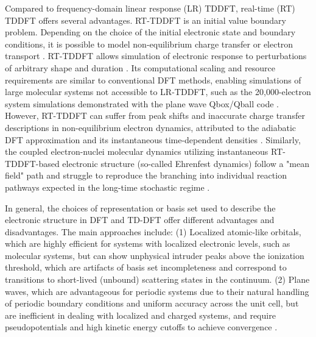 \documentclass[journal=jctcce,manuscript=article,etalmode=truncate,maxauthors=10,layout=twocolumn,9pt]{achemso}   %
\begin{document}
Compared to frequency-domain linear response (LR) TDDFT, real-time (RT) TDDFT offers several advantages. RT-TDDFT is an initial value boundary problem. Depending on the choice of the initial electronic state and boundary conditions, it is possible to model non-equilibrium charge transfer or electron transport \cite{chem-rev-Li}. RT-TDDFT allows simulation of electronic response to perturbations of arbitrary shape and duration \cite{chem-rev-Li}. Its computational scaling and resource requirements are similar to conventional DFT methods, enabling simulations of large molecular systems not accessible to LR-TDDFT, such as the 20,000-electron system simulations demonstrated with the plane wave Qbox/Qball code \cite{qbox-2008,qball-2017,qball-II-2021}. However, RT-TDDFT can suffer from peak shifts and inaccurate charge transfer descriptions in non-equilibrium electron dynamics, attributed to the adiabatic DFT approximation and its instantaneous time-dependent densities \cite{peak-shift-isborn-2015,peak-shift-maitra-2016,ct-maitra-2013,ct-maitra-2014}. Similarly, the coupled electron-nuclei molecular dynamics utilizing instantaneous RT-TDDFT-based electronic structure (so-called Ehrenfest dynamics) follow a "mean field" path and struggle to reproduce the branching into individual reaction pathways expected in the long-time stochastic regime \cite{Thruhlar-2018}.


In general, the choices of representation or basis set used to describe the electronic structure in DFT and TD-DFT offer different advantages and disadvantages. The main approaches include: (1) Localized atomic-like orbitals, 
 which are highly efficient for systems with localized electronic levels, such as molecular systems, but can show unphysical intruder peaks  above the ionization threshold,  which are artifacts of basis set incompleteness  and correspond to transitions to short-lived (unbound) scattering states in the  continuum.\cite{qchem5,chem-rev-Li,lopata-2011,DFTB+}  
(2) Plane waves, which are advantageous for periodic systems due to their natural handling of periodic boundary conditions and uniform accuracy across the unit cell, but  are inefficient in dealing with localized and charged systems,  and require pseudopotentials and high kinetic energy cutoffs to achieve convergence \cite{octopus,qball-2017,qball-II-2021,QE-TDDFT2}. 
 
\end{document}
